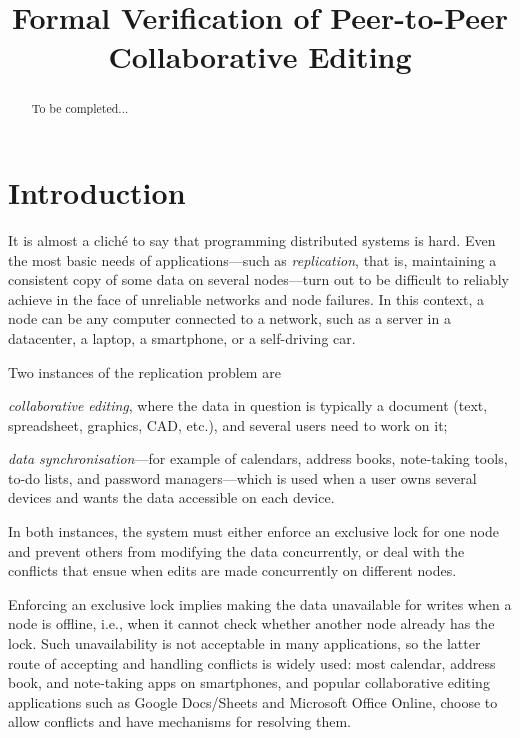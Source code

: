 \documentclass[acmlarge,review,anonymous]{acmart}\settopmatter{printfolios=true}
\begin{document}
\title{Formal Verification of Peer-to-Peer Collaborative Editing}

\maketitle

\begin{abstract}
To be completed...
\end{abstract}


\section{Introduction}
\label{sect.introduction}

It is almost a clich{\' e} to say that programming distributed systems is hard. Even the most basic
needs of applications---such as \emph{replication}, that is, maintaining a consistent copy of some
data on several nodes---turn out to be difficult to reliably achieve in the face of unreliable
networks and node failures. In this context, a node can be any computer connected to a network, such
as a server in a datacenter, a laptop, a smartphone, or a self-driving car.

Two instances of the replication problem are
\begin{inparaenum}
\item \emph{collaborative editing}, where the data in question is typically a document (text,
    spreadsheet, graphics, CAD, etc.), and several users need to work on it;
\item \emph{data synchronisation}---for example of calendars, address books, note-taking tools,
    to-do lists, and password managers---which is used when a user owns several devices and wants
    the data accessible on each device.
\end{inparaenum}
In both instances, the system must either enforce an exclusive lock for one node and prevent others
from modifying the data concurrently, or deal with the conflicts that ensue when edits are made
concurrently on different nodes.

Enforcing an exclusive lock implies making the data unavailable for writes when a node is offline,
i.e., when it cannot check whether another node already has the lock. Such unavailability is not
acceptable in many applications, so the latter route of accepting and handling conflicts is widely
used: most calendar, address book, and note-taking apps on smartphones, and popular collaborative
editing applications such as Google Docs/Sheets and Microsoft Office Online, choose to allow
conflicts and have mechanisms for resolving them.
\end{document}
